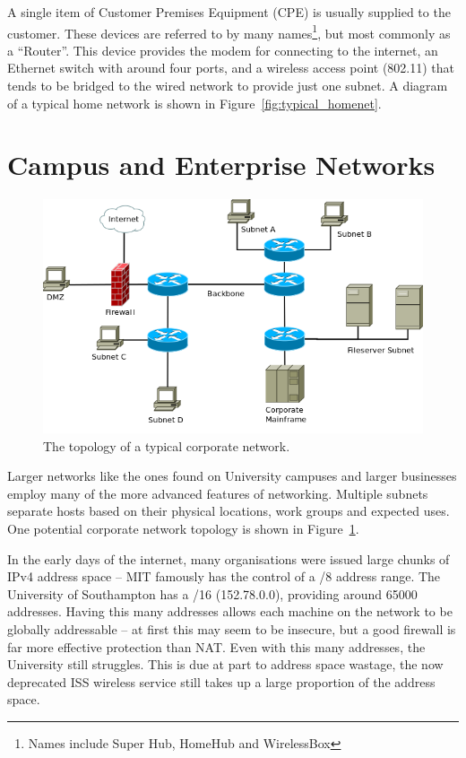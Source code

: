 \documentclass[12pt,a4paper,twoside]{report}
\begin{document}
A single item of Customer Premises Equipment (CPE)  is usually supplied to the customer. These devices are
referred to by many names\footnote{Names include Super Hub, HomeHub and
WirelessBox}, but most commonly as a ``Router''.  This device provides the modem for
connecting to the internet, an Ethernet switch with around four ports, and a
wireless access point (802.11) that tends to be bridged to the wired network to
provide just one subnet. A diagram of a typical home network is shown in
Figure~\ref{fig:typical_homenet}.

\section{Campus and Enterprise Networks}
\begin{figure}
\begin{center}
	\includegraphics[width=\linewidth]{../Diagrams/Network/CorporateNetwork.png}
	\caption{The topology of a typical corporate network.}\label{fig:corporate_net}
\end{center}
\end{figure}
Larger networks like the ones found on University campuses and larger
businesses employ many of the more advanced features of networking.
Multiple subnets separate hosts based on their physical locations,
work groups and expected uses. One potential corporate network
topology is shown in Figure~\ref{fig:corporate_net}.

In the early days of the internet, many organisations were issued large
chunks of IPv4 address space -- MIT famously has the control of a /8 address
range. The University of Southampton has a /16 (152.78.0.0), providing around
65000 addresses. Having this many addresses allows each machine on the network
to be globally addressable -- at first this may seem to be insecure, but a good
firewall is far more effective protection than NAT\@. Even with this many
addresses, the University still struggles. This is due at part to address space
wastage, the now deprecated ISS wireless service still takes up a large
proportion of the address space.
\end{document}
